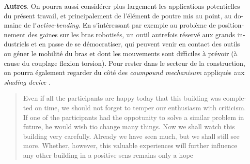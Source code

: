 \begin{otherlanguage}{french}
    \textbf{Autres}. On pourra aussi considérer plus largement les applications potentielles du présent travail, et principalement de l'élément de poutre mis au point, au domaine de l'\emph{active-bending}. En s'intéressant par exemple au problème de positionnement des gaines sur les bras robotisés, un outil autrefois réservé aux grands industriels et en passe de se démocratiser, qui peuvent venir en contact des outils ou géner le mobilité du bras et dont les mouvements sont difficiles à prévoir (à cause du couplage flexion torsion). Pour rester dans le secteur de la construction, on pourra également regarder du côté des \emph{coumpound mechanisum} appliqués aux \emph{shading device} \cite{Charpentier2017}.






\blockcquote[Frei Otto][p.~14]{IL13}{Even if all the participants are happy today that this building was completed on time, we should not forget to temper our enthusiasm with criticism. If one of the participants had the oppotunity to solve a similar problem in future, he would wish tio change many things. Now we shall watch this building very carefully. Already we have seen much, but we shall still see more. Whether, however, this valuable experiences will further influence any other building in a positive sens remains only a hope}


\end{otherlanguage}

